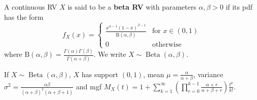 \begin{definition}[beta RV]
	A continuous RV $X$ is said to be a \textbf{beta RV} with parameters $\alpha,\beta>0$ if its pdf has the form
	$$f_X(x)=\begin{cases}
		\frac{x^{\alpha-1}(1-x)^{\beta-1}} {\mathrm{B}(\alpha,\beta)} & \text{for $x\in(0,1)$}\\
		0 & \text{otherwise}
	\end{cases}$$
	where $\mathrm{B}(\alpha,\beta) = \frac{\Gamma(\alpha)\Gamma(\beta)}{\Gamma(\alpha + \beta)}$. We write $X\sim \operatorname{Beta}(\alpha,\beta)$.
\end{definition}

If $X\sim \operatorname{Beta}(\alpha,\beta)$, $X$ has support $(0,1)$, mean $\mu=\frac{\alpha}{\alpha + \beta}$, variance $\sigma^2=\frac{\alpha\beta}{(\alpha+\beta)^2(\alpha+\beta+1)}$ and mgf $M_X(t)=1+\sum_{k=1}^{\infty} \left( \prod_{r=0}^{k-1} \frac{\alpha+r}{\alpha+\beta+r} \right) \frac{t^k}{k!}$.
